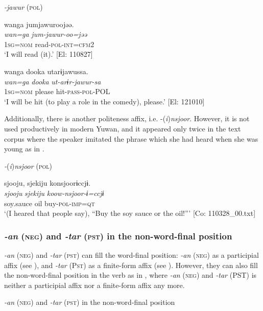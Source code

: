 \ea\label{ex:8-143}
  \textit{-jawur} (\textsc{pol})

\ea {\TM}
\glll  wanga  jumjawuroojəə.\\
\textit{wan=ga}  \textit{jum-jawur-oo=jəə}\\
1\textsc{sg}=\textsc{nom}  read-\textsc{pol}-\textsc{int}=\textsc{cfm2}\\
\glt ‘I will read (it).’ [El: 110827]

\ex
{\TM}
\glll  wanga  dooka  utarɨjawussa.\\
\textit{wan=ga}  \textit{dooka}  \textit{ut-arɨr-jawur-sa}\\
1\textsc{sg}=\textsc{nom}  please  hit-\textsc{pass}-\textsc{pol}-POL\\
\glt ‘I will be hit (to play a role in the comedy), please.’ [El: 121010]
\z
\z

  Additionally, there is another politeness affix, i.e. -(\textit{i})\textit{nsjoor}. However, it is not used productively in modern Yuwan, and it appeared only twice in the text corpus where the speaker imitated the phrase which she had heard when she was young as in .

\ea\label{ex:8-144}
  \textit{-}(\textit{i})\textit{nsjoor} (\textsc{pol})

  {\TM}
\glll  {\textbar}sjooju,  sjekiju{\textbar}  konsjoorɨccjɨ.\\
\textit{sjooju}  \textit{sjekiju}  \textit{koow-nsjoor-ɨ=ccjɨ}\\
    soy.sauce  oil  buy-\textsc{pol}-\textsc{imp}=\textsc{qt}\\
\glt ‘(I heared that people say), “Buy the soy sauce or the oil!”’ [Co: 110328\_00.txt]
\z

\subsubsection{\textit{-an} (\textsc{neg}) and \textit{-tar} (\textsc{pst}) in the non-word-final position}

\textit{-an} (\textsc{neg}) and \textit{-tar} (\textsc{pst}) can fill the word-final position: \textit{-an} (\textsc{neg}) as a participial affix (see ), and \textit{-tar} (P\textsc{st}) as a finite-form affix (see ). However, they can also fill the non-word-final position in the verb as in , where \textit{-an} (\textsc{neg}) and \textit{-tar} (PST) is neither a participial affix nor a finite-form affix any more.

\ea\label{ex:8-145}
  \textit{-an} (\textsc{neg}) and \textit{-tar} (\textsc{pst}) in the non-word-final position

